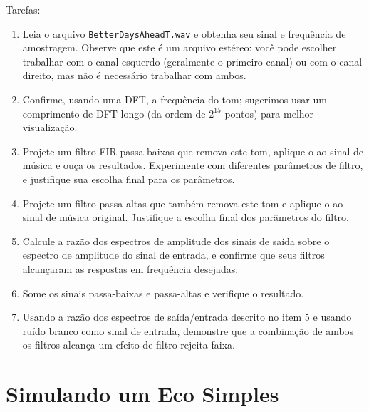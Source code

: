 \documentclass[a4paper,twoside,12pt]{article}
\begin{document}
	Tarefas:
	\begin{enumerate}
		\item Leia o arquivo {\tt BetterDaysAheadT.wav} e obtenha seu sinal e frequência de amostragem. Observe que este é um arquivo estéreo: você pode escolher trabalhar com o canal esquerdo (geralmente o primeiro canal) ou com o canal direito, mas não é necessário trabalhar com ambos.
		
		\item Confirme, usando uma DFT, a frequência do tom; sugerimos usar um comprimento de DFT longo (da ordem de $2^{15}$ pontos) para melhor visualização.
		
		\item Projete um filtro FIR passa-baixas que remova este tom, aplique-o ao sinal de música e ouça os resultados. Experimente com diferentes parâmetros de filtro, e justifique sua escolha final para os parâmetros.
		
		\item Projete um filtro passa-altas que também remova este tom e aplique-o ao sinal de música original. Justifique a escolha final dos parâmetros do filtro.
		
		\item Calcule a razão dos espectros de amplitude dos sinais de saída sobre o espectro de amplitude do sinal de entrada, e confirme que seus filtros alcançaram as respostas em frequência desejadas.
		
		\item Some os sinais passa-baixas e passa-altas e verifique o resultado.
		
		\item Usando a razão dos espectros de saída/entrada descrito no item 5 e usando ruído branco como sinal de entrada, demonstre que a combinação de ambos os filtros alcança um efeito de filtro rejeita-faixa.
		
	\end{enumerate}
	
	\section{Simulando um Eco Simples}
	
\end{document}
